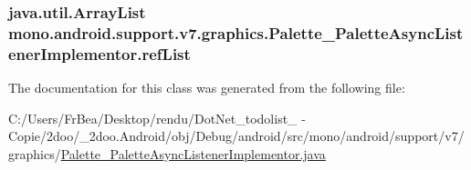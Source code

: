 \hypertarget{classmono_1_1android_1_1support_1_1v7_1_1graphics_1_1_palette___palette_async_listener_implementor_a48f038c073bd65682d81ca5089716b0}{
\subsubsection[{refList}]{\setlength{\rightskip}{0pt plus 5cm}java.util.ArrayList {\bf mono.android.support.v7.graphics.Palette\_\-PaletteAsyncListenerImplementor.refList}}}
\label{classmono_1_1android_1_1support_1_1v7_1_1graphics_1_1_palette___palette_async_listener_implementor_a48f038c073bd65682d81ca5089716b0}




The documentation for this class was generated from the following file:\begin{CompactItemize}
\item 
C:/Users/FrBea/Desktop/rendu/DotNet\_\-todolist\_ - Copie/2doo/\_\-2doo.Android/obj/Debug/android/src/mono/android/support/v7/graphics/\hyperlink{_palette___palette_async_listener_implementor_8java}{Palette\_\-PaletteAsyncListenerImplementor.java}\end{CompactItemize}
